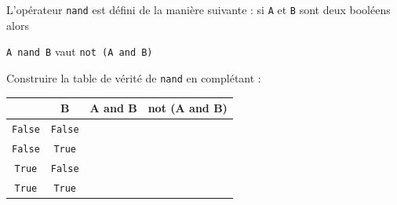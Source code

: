 \begin{exercice}
	L'opérateur \texttt{nand} est défini de la manière suivante : si \texttt{A} et \texttt{B} sont deux booléens alors
	\begin{center}
		\texttt{A nand B} vaut \texttt{not (A and B)}
	\end{center}
	Construire la table de vérité de \texttt{nand} en complétant :
	\begin{center}

		\begin{tabular}{|c|c|c|c|}
			\hline
			\rowcolor{UGLiOrange}{\boxfont\color{white} A} & {\boxfont\color{white} B} & {\boxfont\color{white} A and B} & {\boxfont\color{white} not (A and B)} \\
			\hline
			\texttt{False}                           & \texttt{False}      &                                 &                                       \\
			\hline
			\texttt{False}                           & \texttt{True}       &                                 &                                       \\
			\hline
			\texttt{True}                            & \texttt{False}      &                                 &                                       \\
			\hline
			\texttt{True}                            & \texttt{True}       &                                 &                                       \\
			\hline
		\end{tabular}
	\end{center}
\end{exercice}


